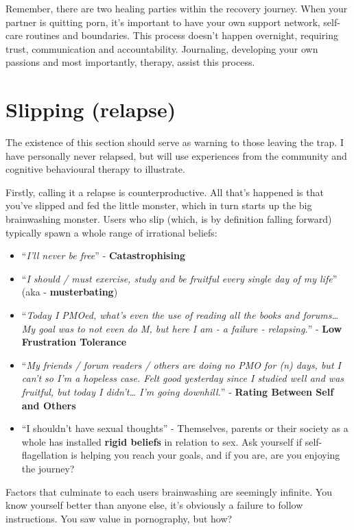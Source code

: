\documentclass[
]{book}
\providecommand{\tightlist}{%
  \setlength{\itemsep}{0pt}\setlength{\parskip}{0pt}}
\begin{document}
Remember, there are two healing parties within the recovery journey. When your partner is quitting porn, it's important to have your own support network, self-care routines and boundaries. This process doesn't happen overnight, requiring trust, communication and accountability. Journaling, developing your own passions and most importantly, therapy, assist this process.

\hypertarget{slipping-relapse}{%
\section{Slipping (relapse)}\label{slipping-relapse}}

The existence of this section should serve as warning to those leaving the trap. I have personally never relapsed, but will use experiences from the community and cognitive behavioural therapy to illustrate.

Firstly, calling it a relapse is counterproductive. All that's happened is that you've slipped and fed the little monster, which in turn starts up the big brainwashing monster. Users who slip (which, is by definition falling forward) typically spawn a whole range of irrational beliefs:

\begin{itemize}
\tightlist
\item
  ``\emph{I'll never be free}'' - \textbf{Catastrophising}
\item
  ``\emph{I should / must exercise, study and be fruitful every single day of my life}'' (aka - \textbf{musterbating})
\item
  ``\emph{Today I PMOed, what's even the use of reading all the books and forums\ldots{} My goal was to not even do M, but here I am - a failure - relapsing.}'' - \textbf{Low Frustration Tolerance}
\item
  ``\emph{My friends / forum readers / others are doing no PMO for (n) days, but I can't so I'm a hopeless case. Felt good yesterday since I studied well and was fruitful, but today I didn't\ldots{} I'm going downhill.}'' - \textbf{Rating Between Self and Others}
\item
  ``I shouldn't have sexual thoughts'' - Themselves, parents or their society as a whole has installed \textbf{rigid beliefs} in relation to sex. Ask yourself if self-flagellation is helping you reach your goals, and if you are, are you enjoying the journey?
\end{itemize}

Factors that culminate to each users brainwashing are seemingly infinite. You know yourself better than anyone else, it's obviously a failure to follow instructions. You saw value in pornography, but how?
\end{document}
